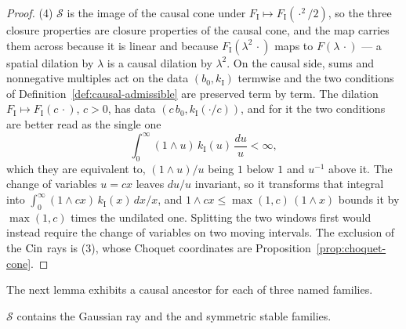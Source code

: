 \begin{proof}
(4) $\mathcal{S}$ is the image of the causal cone under $F_{\mathrm I} \mapsto
F_{\mathrm I}(\cdot^2/2)$, so the three closure properties are closure properties of the causal
cone, and the map carries them across because it is linear and because
$F_{\mathrm I}(\lambda^2\,\cdot)$ maps to $F(\lambda\,\cdot)$ --- a spatial dilation by
$\lambda$ is a causal dilation by $\lambda^2$. On the causal side, sums and nonnegative
multiples act on the data $(b_0, k_{\mathrm I})$ termwise and the two conditions of
Definition~\ref{def:causal-admissible} are preserved term by term. The dilation
$F_{\mathrm I} \mapsto F_{\mathrm I}(c\,\cdot)$, $c > 0$, has data
$(c\,b_0, k_{\mathrm I}(\cdot/c))$, and for it the two conditions are better read as the single
one
\[
  \int_0^\infty (1 \wedge u)\,k_{\mathrm I}(u)\,\frac{du}{u} < \infty,
\]
which they are equivalent to, $(1 \wedge u)/u$ being $1$ below $1$ and $u^{-1}$ above it. The
change of variables $u = cx$ leaves $du/u$ invariant, so it transforms that integral into
$\int_0^\infty (1 \wedge cx)\,k_{\mathrm I}(x)\,dx/x$, and
$1 \wedge cx \le \max(1,c)\,(1 \wedge x)$ bounds it by $\max(1,c)$ times the undilated one.
Splitting the two windows first would instead require the change of variables on two moving
intervals. The exclusion of the $\operatorname{Cin}$ rays is (3), whose Choquet coordinates are
Proposition~\ref{prop:choquet-cone}.
\end{proof}

The next lemma exhibits a causal ancestor for each of three named families.

\begin{lemma}\label{lem:subordinated-members}
$\mathcal{S}$ contains the Gaussian ray and the \Matern{} and symmetric stable families.
\end{lemma}

